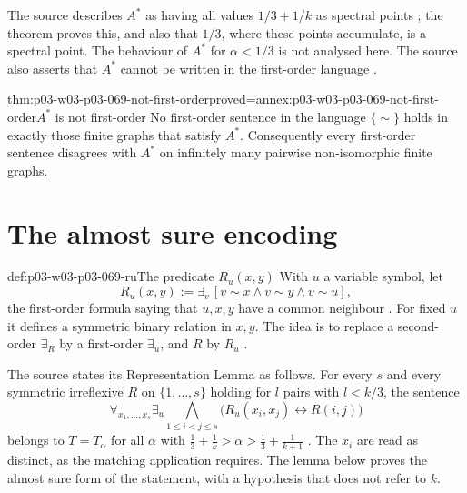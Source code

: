 The source describes \(A^*\) as having all values \(1/3+1/k\) as spectral
points \cite[p.~16]{Spencer2007LogicRandomStructuresAuthor}; the theorem
proves this, and also that \(1/3\), where these points accumulate, is a
spectral point.  The behaviour of \(A^*\) for \(\alpha<1/3\) is not
analysed here.  The source also asserts that \(A^*\) cannot be written in the
first-order language \cite[p.~16]{Spencer2007LogicRandomStructuresAuthor}.

\begin{hbtheorem}{thm:p03-w03-p03-069-not-first-order}{proved=annex:p03-w03-p03-069-not-first-order}{\(A^*\) is not first-order}
No first-order sentence in the language \(\{\sim\}\) holds in exactly those
finite graphs that satisfy \(A^*\).  Consequently every first-order sentence
disagrees with \(A^*\) on infinitely many pairwise non-isomorphic finite
graphs.
\end{hbtheorem}

\section{The almost sure encoding}
\label{sec:p03-w03-p03-069-encoding}

\begin{hbdefinition}{def:p03-w03-p03-069-ru}{The predicate \(R_u(x,y)\)}
With \(u\) a variable symbol, let
\[
  R_u(x,y):=\exists_v\,[v\sim x\wedge v\sim y\wedge v\sim u],
\]
the first-order formula saying that \(u,x,y\) have a common neighbour
\cite[p.~17]{Spencer2007LogicRandomStructuresAuthor}.  For fixed \(u\) it
defines a symmetric binary relation in \(x,y\).  The idea is to replace a
second-order \(\exists_R\) by a first-order \(\exists_u\), and \(R\) by
\(R_u\) \cite[p.~17]{Spencer2007LogicRandomStructuresAuthor}.
\end{hbdefinition}

The source states its Representation Lemma as follows.  For every \(s\) and
every symmetric irreflexive \(R\) on \(\{1,\ldots,s\}\) holding for \(l\)
pairs with \(l<k/3\), the sentence
\[
  \forall_{x_1,\ldots,x_s}\exists_u\bigwedge_{1\leq i<j\leq s}
  \bigl(R_u(x_i,x_j)\leftrightarrow R(i,j)\bigr)
\]
belongs to \(T=T_\alpha\) for all \(\alpha\) with
\(\tfrac13+\tfrac1k>\alpha>\tfrac13+\tfrac1{k+1}\)
\cite[p.~17]{Spencer2007LogicRandomStructuresAuthor}.  The \(x_i\) are read
as distinct, as the matching application requires.  The lemma below proves
the almost sure form of the statement, with a hypothesis that does not refer
to \(k\).

